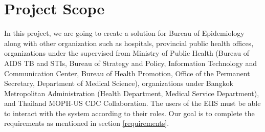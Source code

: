 \section{Project Scope}
    
    In this project, we are going to create a solution for Bureau of Epidemiology along with other organization such as hospitals, provincial public health offices, organizations under the supervised from Ministry of Public Health (Bureau of AIDS TB and STIs, Bureau of Strategy and Policy, Information Technology and Communication Center, Bureau of Health Promotion, Office of the Permanent Secretary, Department of Medical Science), organizations under Bangkok Metropolitan Administration (Health Department, Medical Service Department), and Thailand MOPH-US CDC Collaboration. The users of the EIIS must be able to interact with the system according to their roles. Our goal is to complete the requirements as mentioned in section \ref{requirements}.
